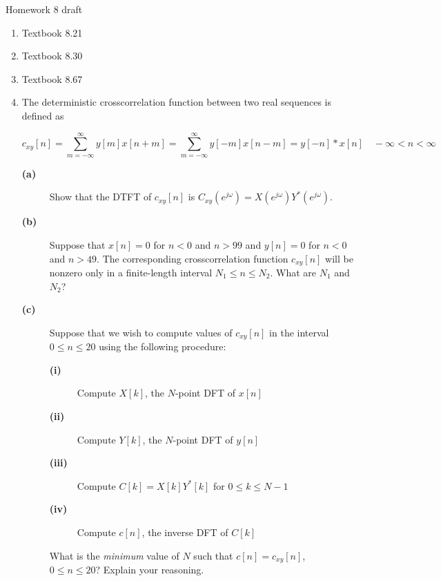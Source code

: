 \documentclass[11pt]{article}
\begin{document}
Homework 8 draft

\begin{enumerate}
\vspace{5mm}
\item Textbook 8.21 %

\vspace{5mm}
\item Textbook 8.30 %

\vspace{5mm} 
\item Textbook 8.67 %

\vspace{5mm} 
\item The deterministic crosscorrelation function between two real sequences is defined as

\[
c_{xy}[n]=\sum_{m=-\infty}^\infty y[m]x[n+m] = \sum_{m=-\infty}^\infty y[-m]x[n-m]=y[-n]*x[n]\quad -\infty < n < \infty
\]

\begin{description}
\item[\textbf{(a)}] Show that the DTFT of $c_{xy}[n]$ is $C_{xy}(e^{j\omega}) = X(e^{j\omega})Y^*(e^{j\omega})$.
\item[\textbf{(b)}] Suppose that $x[n] = 0$ for $n < 0$ and $n > 99$ and $y[n]=0$ for $n < 0$ and $n > 49$. The corresponding crosscorrelation function $c_{xy}[n]$ will be nonzero only in a finite-length interval $N_1 \leq n \leq N_2$. What are $N_1$ and $N_2$?
\item[\textbf{(c)}] Suppose that we wish to compute values of $c_{xy}[n]$ in the interval $0 \leq n \leq 20$ using the following procedure:
\begin{description}
\item[\textbf{(i)}] Compute $X[k]$, the $N$-point DFT of $x[n]$
\item[\textbf{(ii)}] Compute $Y[k]$, the $N$-point DFT of $y[n]$
\item[\textbf{(iii)}] Compute $C[k]=X[k]Y^*[k]$ for $0 \leq k \leq N - 1$
\item[\textbf{(iv)}] Compute $c[n]$, the inverse DFT of $C[k]$
\end{description}
What is the \textit{minimum} value of $N$ such that $c[n] = c_{xy}[n]$, $0 \leq n \leq 20$? Explain your reasoning.
\end{description}


\end{enumerate}
\end{document}
